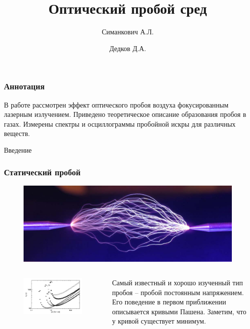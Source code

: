 \documentclass{beamer}
\title[About Beamer] %
{Оптический пробой сред}
\author[Arthur, Doe] %
{Симанкович А.Л. \and Дедков Д.А. }
\institute[VFU] %
{
	Московский Физико-Технический Институт
}
\date[VLC 2023] %
\begin{document}
	
	\frame{\titlepage}
	
	\begin{frame}
		\frametitle{Аннотация}
				
		В работе рассмотрен эффект оптического пробоя воздуха фокусированным лазерным излучением. Приведено теоретическое описание образования пробоя в газах. Измерены спектры и осциллограммы пробойной искры для различных веществ.
		
	\end{frame}


	\begin{frame}[plain,c]
		
		\begin{center}
			\huge {} Введение
		\end{center}
	
	\end{frame}
	
	
	\begin{frame}
		\frametitle{Статический пробой}

		\begin{figure}
			\includegraphics[width=0.8\linewidth]{res/const_discharge.jpg}
		\end{figure}
		
		\begin{columns}
			\begin{figure}
				\includegraphics[width=\linewidth]{res/paschen.jpg}
			\end{figure}

			Самый известный и хорошо изученный тип пробоя -- пробой постоянным напряжением. Его поведение в первом приближении описывается кривыми Пашена.
			Заметим, что у кривой существует минимум.
		\end{columns}
		
		
	\end{frame}
\end{document}
